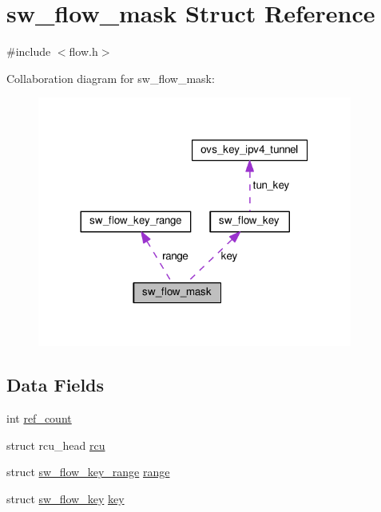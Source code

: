\hypertarget{structsw__flow__mask}{}\section{sw\+\_\+flow\+\_\+mask Struct Reference}
\label{structsw__flow__mask}


{\ttfamily \#include $<$flow.\+h$>$}



Collaboration diagram for sw\+\_\+flow\+\_\+mask\+:
\nopagebreak
\begin{figure}[H]
\begin{center}
\leavevmode
\includegraphics[width=293pt]{structsw__flow__mask__coll__graph}
\end{center}
\end{figure}
\subsection*{Data Fields}
\begin{DoxyCompactItemize}
\item 
int \hyperlink{structsw__flow__mask_ad1bf602183e4fa7dfeab96a7ca06243b}{ref\+\_\+count}
\item 
struct rcu\+\_\+head \hyperlink{structsw__flow__mask_aa5aebb526fafd5f7f70b605970a72fd8}{rcu}
\item 
struct \hyperlink{structsw__flow__key__range}{sw\+\_\+flow\+\_\+key\+\_\+range} \hyperlink{structsw__flow__mask_aa6062c0e580d516ff2d9ce8f9611432b}{range}
\item 
struct \hyperlink{structsw__flow__key}{sw\+\_\+flow\+\_\+key} \hyperlink{structsw__flow__mask_a52db0284fdd4579a5f30dee0837a7485}{key}
\end{DoxyCompactItemize}


